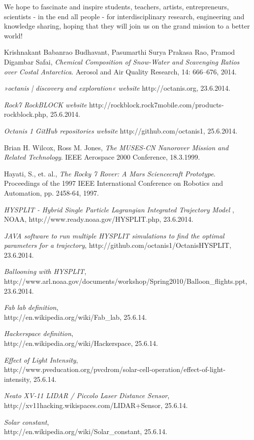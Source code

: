 \documentclass[a4paper,12pt]{article}
\begin{document}
We hope to fascinate and inspire students, teachers, artists, entrepreneurs, scientists - in the end all people - for interdisciplinary research, engineering and knowledge sharing, hoping that they will join us on the grand mission to a better world!


\pagebreak
\pagestyle{empty}
\begin{thebibliography}{1}


  Krishnakant Babanrao Budhavant, Pasumarthi Surya Prakasa Rao, Pramod Digambar Safai,
  \emph{Chemical Composition of Snow-Water and Scavenging Ratios over Costal Antarctica}.
  Aerosol and Air Quality Research, 14: 666–676, 2014.

{\em »octanis | discovery and exploration« website} http://octanis.org, 23.6.2014.

{\em Rock7 RockBLOCK website} http://rockblock.rock7mobile.com/products-rockblock.php, 25.6.2014.


{\em Octanis 1 GitHub repositories website} http://github.com/octanis1, 25.6.2014.

  Brian H. Wilcox, Ross M. Jones, 
  \emph{The MUSES-CN Nanorover Mission and Related Technology}.
  IEEE Aerospace 2000 Conference, 18.3.1999.


  Hayati, S., et. al., 
  \emph{The Rocky 7 Rover: A Mars Sciencecraft Prototype}.
  Proceedings of the 1997 IEEE International Conference on Robotics and Automation, pp. 2458-64, 1997.

  {\em HYSPLIT - Hybrid Single Particle Lagrangian Integrated Trajectory Model }, NOAA, http://www.ready.noaa.gov/HYSPLIT.php, 23.6.2014.

  {\em JAVA software to run multiple HYSPLIT simulations to find the optimal parameters for a trajectory}, http://github.com/octanis1/OctanisHYSPLIT, 23.6.2014.

	{\em Ballooning with HYSPLIT}, \\
	http://www.arl.noaa.gov/documents/workshop/Spring2010/Balloon\_flights.ppt, 23.6.2014.

	{\em Fab lab definition}, \\
	http://en.wikipedia.org/wiki/Fab\_lab, 25.6.14.

	{\em Hackerspace definition}, \\
	http://en.wikipedia.org/wiki/Hackerspace, 25.6.14.

	{\em Effect of Light Intensity}, \\
	http://www.pveducation.org/pvcdrom/solar-cell-operation/effect-of-light-intensity, 25.6.14.

	{\em Neato XV-11 LIDAR / Piccolo Laser Distance Sensor}, \\
	http://xv11hacking.wikispaces.com/LIDAR+Sensor, 25.6.14.

	{\em Solar constant}, \\
	http://en.wikipedia.org/wiki/Solar\_constant, 25.6.14.

\end{thebibliography}
\end{document}
